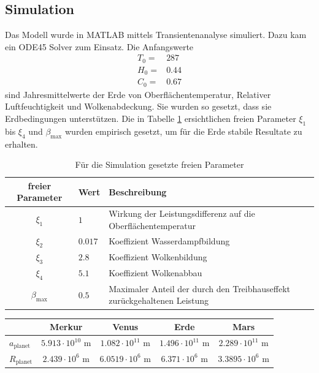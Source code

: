 \begin{refsection}
\section{Simulation}
Das Modell wurde in MATLAB mittels Transientenanalyse simuliert. Dazu kam ein ODE45 Solver zum Einsatz. Die Anfangswerte
\begin{equation}
\begin{matrix}
T_0 = & 287 \\
H_0 = & 0.44 \\
C_0 = & 0.67
\end{matrix}
\end{equation}
sind Jahresmittelwerte der Erde von Oberflächentemperatur, Relativer Luftfeuchtigkeit und Wolkenabdeckung. Sie wurden so gesetzt, dass sie Erdbedingungen unterstützen.
Die in Tabelle \ref{planeten:xiValues} ersichtlichen freien Parameter $\xi_1$ bis $\xi_4$ und $\beta_{\text{max}}$ wurden empirisch gesetzt, um für die Erde stabile Resultate zu erhalten.
\begin{table}%
	\centering
	\begin{tabular}{c|l|p{8cm}}
freier Parameter        & Wert                  & Beschreibung \\
  \hline
$\xi_1$ & $1\phantom{.000}$					& Wirkung der Leistungsdifferenz auf die Oberflächentemperatur\\
$\xi_2$ & $0.017$	& Koeffizient Wasserdampfbildung\\
$\xi_3$ & $2.8$	& Koeffizient Wolkenbildung \\
$\xi_4$ & $5.1$	& Koeffizient Wolkenabbau \\
$\beta_{\text{max}}$ & $0.5$	& Maximaler Anteil der durch den Treibhauseffekt zurückgehaltenen Leistung
	\end{tabular}
	\caption{Für die Simulation gesetzte freien Parameter}
	\label{planeten:xiValues}
\end{table}
\begin{table}%
	\centering
	\begin{tabular}{l|c c c c}
                        & Merkur                    & Venus                    & Erde                    & Mars     \\
  \hline
  $a_{\text{planet}}$   & $5.913 \cdot 10^{10}$ m   & $1.082 \cdot 10^{11}$ m  & $1.496 \cdot 10^{11}$ m & $2.289 \cdot 10^{11}$ m \\
  $R_{\text{planet}}$   & $2.439 \cdot 10^{6}$ m   & $6.0519 \cdot 10^{6}$ m  & $6.371 \cdot 10^{6}$ m  & $3.3895 \cdot 10^{6}$ m 
\end{tabular}

\end{table}
\end{refsection}
